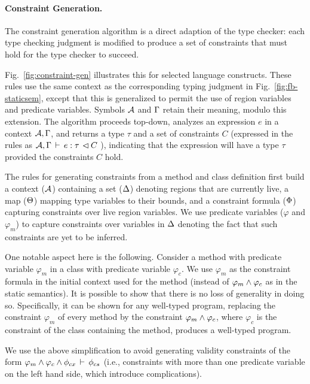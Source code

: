 

\paragraph{Constraint Generation.}
The constraint generation algorithm is a direct adaption of the type checker:
each type checking judgment is modified to produce a set of constraints that must hold
for the type checker to succeed.

Fig.~\ref{fig:constraint-gen} illustrates this for selected language constructs.
These rules use the same context as the corresponding typing judgment in
Fig.~\ref{fig:fb-staticsem}, except that this is generalized to permit the
use of region variables and predicate variables.
Symbols ${\mathcal{A}}$ and $\Gamma$ retain their meaning, modulo this extension.
The algorithm proceeds top-down, analyzes an expression $e$ in a context
${\mathcal{A}},\Gamma$, and returns a type $\tau$ and a set of constraints $C$
(expressed in the rules as ${{\mathcal{A}},\Gamma} \, \vdash \, {e} : {\tau} \, \lhd {C}$ ),
indicating that the expression will have a type $\tau$ provided the constraints $C$ hold.

The rules for generating constraints from a method and
class definition first build a context (${\mathcal{A}}$) containing a set ($ \Delta$) denoting
regions that are currently live, a map ($\Theta$) mapping type
variables to their bounds, and a constraint formula ($\Phi$)
capturing constraints over live region variables. We use predicate
variables ($\varphi$ and $\varphi_m$) to capture constraints over
variables in $\Delta$ denoting the fact that such constraints are yet
to be inferred.

One notable aspect here is the following. Consider a method with predicate
variable $\varphi_m$ in a class with predicate variable $\varphi_c$. 
We use $\varphi_m$ as the constraint formula in the initial context used for
the method (instead of $\varphi_m \wedge \varphi_c$ as in the static semantics).
It is possible to show that there is no loss of generality in doing so.
Specifically, it can be shown for any well-typed program, replacing the constraint
$\varphi_m$ of every method by the constraint $\varphi_m \wedge \varphi_c$,
where $\varphi_c$ is the constraint of the class containing the method,
produces a well-typed program.

We use the above simplification to avoid generating validity constraints of the form
$\varphi_m \wedge \varphi_c \wedge \phi_{cx}\,\vdash\,\phi_{cs}$ (i.e., constraints
with more than one predicate variable on the left hand side, which introduce complications).

